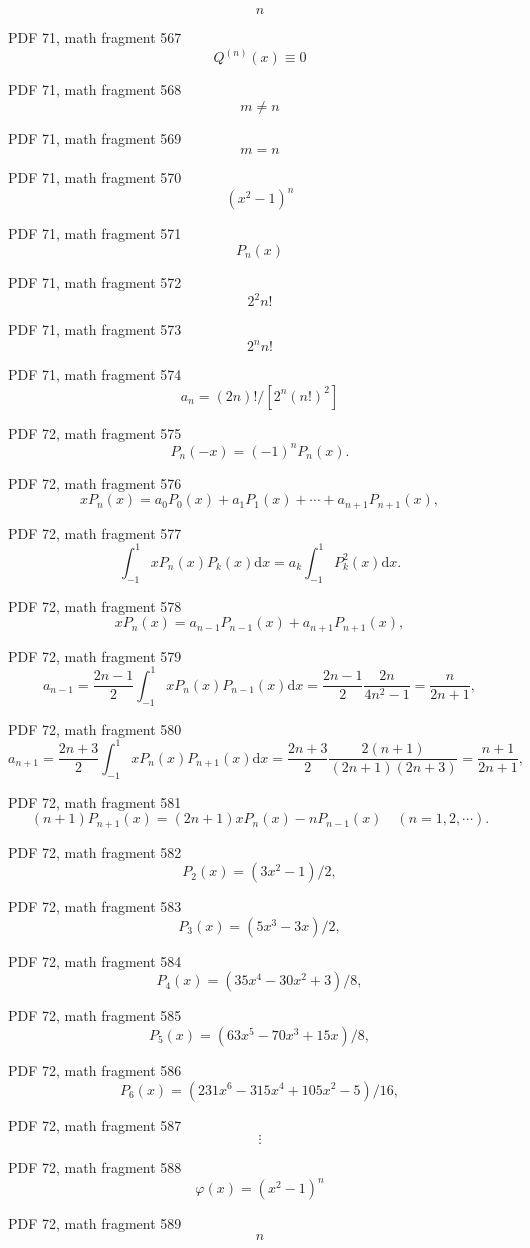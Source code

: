\documentclass[UTF8,fontset=fandol]{ctexart}
\begin{document}
\[n\]
\par
PDF 71, math fragment 567
\[Q^{(n)}(x) \equiv 0\]
\par
PDF 71, math fragment 568
\[m \neq n\]
\par
PDF 71, math fragment 569
\[m = n\]
\par
PDF 71, math fragment 570
\[(x^2-1)^n\]
\par
PDF 71, math fragment 571
\[P_n(x)\]
\par
PDF 71, math fragment 572
\[2^2n!\]
\par
PDF 71, math fragment 573
\[2^nn!\]
\par
PDF 71, math fragment 574
\[a_n=(2n)!/[2^n(n!)^2]\]
\par
PDF 72, math fragment 575
\[
P_n(-x) = (-1)^n P_n(x). \tag{3.4.4}
\]
\par
PDF 72, math fragment 576
\[
xP_n(x) = a_0P_0(x) + a_1P_1(x) + \cdots + a_{n+1}P_{n+1}(x),
\]
\par
PDF 72, math fragment 577
\[
\int_{-1}^{1} xP_n(x)P_k(x) \mathrm{d}x = a_k \int_{-1}^{1} P_k^2(x) \mathrm{d}x.
\]
\par
PDF 72, math fragment 578
\[
xP_n(x) = a_{n-1}P_{n-1}(x) + a_{n+1}P_{n+1}(x),
\]
\par
PDF 72, math fragment 579
\[
a_{n-1} = \frac{2n-1}{2} \int_{-1}^{1} xP_n(x)P_{n-1}(x) \mathrm{d}x = \frac{2n-1}{2} \frac{2n}{4n^2-1} = \frac{n}{2n+1},
\]
\par
PDF 72, math fragment 580
\[
a_{n+1} = \frac{2n+3}{2} \int_{-1}^{1} xP_n(x)P_{n+1}(x) \mathrm{d}x = \frac{2n+3}{2} \frac{2(n+1)}{(2n+1)(2n+3)} = \frac{n+1}{2n+1},
\]
\par
PDF 72, math fragment 581
\[
(n+1)P_{n+1}(x) = (2n+1)xP_n(x) - nP_{n-1}(x) \quad (n=1,2,\cdots). \tag{3.4.5}
\]
\par
PDF 72, math fragment 582
\[
P_2(x) = (3x^2 - 1)/2,
\]
\par
PDF 72, math fragment 583
\[
P_3(x) = (5x^3 - 3x)/2,
\]
\par
PDF 72, math fragment 584
\[
P_4(x) = (35x^4 - 30x^2 + 3)/8,
\]
\par
PDF 72, math fragment 585
\[
P_5(x) = (63x^5 - 70x^3 + 15x)/8,
\]
\par
PDF 72, math fragment 586
\[
P_6(x) = (231x^6 - 315x^4 + 105x^2 - 5)/16,
\]
\par
PDF 72, math fragment 587
\[
\vdots
\]
\par
PDF 72, math fragment 588
\[\varphi(x) = (x^2 - 1)^n\]
\par
PDF 72, math fragment 589
\[n\]
\end{document}
